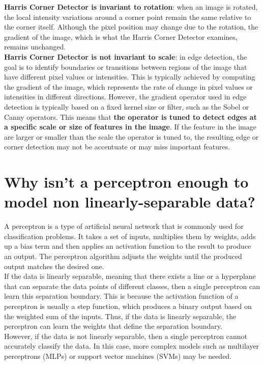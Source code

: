 \documentclass{article}
\begin{document}
\textbf{Harris Corner Detector is invariant to rotation}: when an image is rotated, the local intensity variations around a corner point remain the same relative to the corner itself. Although the pixel position may change due to the rotation, the gradient of the image, which is what the Harris Corner Detector examines, remains unchanged. \\

\textbf{Harris Corner Detector is not invariant to scale}: in edge detection, the goal is to identify boundaries or transitions between regions of the image that have different pixel values or intensities. This is typically achieved by computing the gradient of the image, which represents the rate of change in pixel values or intensities in different directions. However, the gradient operator used in edge detection is typically based on a fixed kernel size or filter, such as the Sobel or Canny operators. This means that \textbf{the operator is tuned to detect edges at a specific scale or size of features in the image}. If the feature in the image are larger or smaller than the scale the operator is tuned to, the resulting edge or corner detection may not be accentuate or may miss important features.

\newpage

\section*{Why isn't a perceptron enough to model non linearly-separable data?}

A perceptron is a type of artificial neural network that is commonly used for classification problems. It takes a set of inputs, multiplies them by weights, adds up a bias term and then applies an activation function  to the result to produce an output. The perceptron algorithm adjusts the weights until the produced output matches the desired one. \\

If the data is linearly separable, meaning that there exists a line or a hyperplane that can separate the data points of different classes, then a single perceptron can learn this separation boundary. This is because the activation function of a perceptron is usually a step function, which produces a binary output based on the weighted sum of the inputs. Thus, if the data is linearly separable, the perceptron can learn the weights that define the separation boundary. \\

However, if the data is not linearly separable, then a single perceptron cannot accurately classify the data. In this case, more complex models such as multilayer perceptrons (MLPs) or support vector machines (SVMs) may be needed. \\
\end{document}
